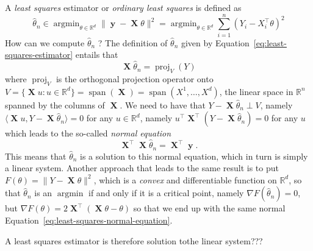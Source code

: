 \documentclass[
	fontsize=11pt, %
	twoside=false, %
	numbers=noenddot, %
]{kaobook}
\DeclareMathOperator{\bX}{\boldsymbol X}
\DeclareMathOperator{\by}{\boldsymbol y}
\DeclareMathOperator*{\argmin}{argmin}
\DeclareMathOperator*{\spa}{span}
\DeclareMathOperator{\proj}{proj}
\newcommand{\R}{\mathbb R}
\newcommand{\wh}{\widehat}
\newcommand{\grad}{\nabla}
\newcommand{\norm}[1]{\|#1\|}
\newcommand{\inr}[1]{\langle #1 \rangle}
\begin{document}
A \emph{least squares} estimator or \emph{ordinary least squares} is defined as
\begin{equation}
	\label{eq:least-squares-estimator}
	\wh \theta_n \in \argmin_{\theta \in \R^d} \norm{\by - \bX \theta}^2 = \argmin_{\theta \in \R^d} \sum_{i=1}^n (Y_i - X_i^\top \theta)^2
\end{equation}
How can we compute $\wh \theta_n$ ?
The definition of $\wh \theta_n$ given by Equation~\eqref{eq:least-squares-estimator} entails that
\begin{equation*}
	\bX \wh \theta_n = \proj_V (Y)
\end{equation*}
where $\proj_V$ is the orthogonal projection operator onto $V = \{ \bX u : u \in \R^d \} = \spa(\bX) = \spa(X^1, \ldots, X^d)$, the linear space in $\R^n$ spanned by the columns of $\bX$.
We need to have that $Y - \bX \wh \theta_n \perp V$, namely $\inr{\bX u, Y - \bX \wh \theta_n} = 0$ for any $u \in \R^d$, namely $u^\top \bX^\top (Y - \bX \wh \theta_n) = 0$ for any $u$ which leads to the so-called \emph{normal equation}
\begin{equation}
	\label{eq:least-squares-normal-equation}
	\bX^\top \bX \wh \theta_n = \bX^\top \by.
\end{equation}
This means that $\wh \theta_n$ is a solution to this normal equation, which in turn is simply a linear system.
Another approach that leads to the same result is to put $F(\theta) = \norm{Y - \bX \theta}^2$, which is a \emph{convex} and differentiable function on $\R^d$, so that $\wh \theta_n$ is an $\argmin$ if and only if it is a critical point, namely $\grad F(\wh \theta_n) = 0$, but $\grad F(\theta) = 2 \bX^\top (\bX \theta - \theta)$ so that we end up with the same normal Equation~\eqref{eq:least-squares-normal-equation}.

A least squares estimator is therefore solution tothe linear system???
\end{document}
